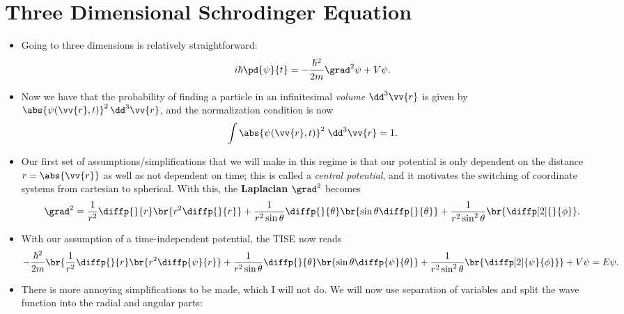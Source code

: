 \section{Three Dimensional Schrodinger Equation}

\begin{itemize}
    \item Going to three dimensions is relatively straightforward:
        \begin{equation}
            i\hbar \pd{\psi}{t} = -\frac{\hbar^2}{2m}\grad^2\psi + V\psi.\label{eq:ThreeDimSchrodingerEQ}
        \end{equation}
    \item Now we have that the probability of finding a particle in an infinitesimal \textit{volume} $\dd^3\vv{r}$ is given by $\abs{\psi(\vv{r},t)}^2\,\dd^3\vv{r}$, and the normalization condition is now
        \begin{equation}
            \int\abs{\psi(\vv{r},t)}^2 \;\dd^3\vv{r} = 1.\label{eq:ThreeDimNormCondition}
        \end{equation}
    \item Our first set of assumptions/simplifications that we will make in this regime is that our potential is only dependent on the distance $r = \abs{\vv{r}}$ as well as not dependent on time; this is called a \textit{central potential}, and it motivates the switching of coordinate systems from cartesian to spherical. With this, the \textbf{Laplacian} $\grad^2$ becomes
        \begin{equation}
            \grad^2 = \frac{1}{r^2}\diffp{}{r}\br{r^2\diffp{}{r}} + \frac{1}{r^2\sin\theta}\diffp{}{\theta}\br{\sin\theta \diffp{}{\theta}} + \frac{1}{r^2\sin^2\theta}\br{\diffp[2]{}{\phi}}.
        \end{equation}
    \item With our assumption of a time-independent potential, the TISE now reads
        \begin{equation*}
            -\frac{\hbar^2}{2m}\br{\frac{1}{r^2}\diffp{}{r}\br{r^2\diffp{\psi}{r}} + \frac{1}{r^2\sin\theta}\diffp{}{\theta}\br{\sin\theta \diffp{\psi}{\theta}} + \frac{1}{r^2\sin^2\theta}\br{\diffp[2]{\psi}{\phi}}} + V\psi = E\psi.
        \end{equation*}
    \item There is more annoying simplifications to be made, which I will not do. We will now use separation of variables and split the wave function into the radial and angular parts:
        \begin{equation}

\end{equation}
\end{itemize}
